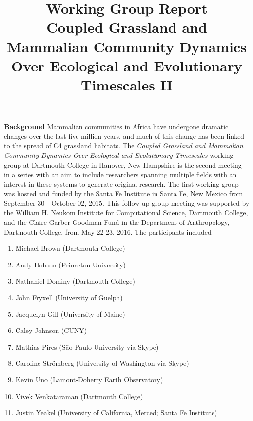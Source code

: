 \documentclass{article}[10pt]
\title{Working Group Report \\ 
Coupled Grassland and Mammalian Community Dynamics Over Ecological and Evolutionary Timescales II}
\begin{document}
\maketitle

{\bf Background} Mammalian communities in Africa have undergone dramatic changes over the last five million years, and much of this change has been linked to the spread of C4 grassland habitats.
The \emph{Coupled Grassland and Mammalian Community Dynamics Over Ecological and Evolutionary Timescales} working group at Dartmouth College in Hanover, New Hampshire is the second meeting in a series with an aim to include researchers spanning multiple fields with an interest in these systems to generate original research.
The first working group was hosted and funded by the Santa Fe Institute in Santa Fe, New Mexico from September 30 - October 02, 2015.
This follow-up group meeting was supported by the William H. Neukom Institute for Computational Science, Dartmouth College, and the Claire Garber Goodman Fund in the Department of Anthropology, Dartmouth College, from May 22-23, 2016.
The participants included

\begin{enumerate}
\item Michael Brown (Dartmouth College)
\item Andy Dobson (Princeton University)
\item Nathaniel Dominy (Dartmouth College)
\item John Fryxell (University of Guelph)
\item Jacquelyn Gill (University of Maine)
\item Caley Johnson (CUNY)
\item Mathias Pires (S\~ao Paulo University via Skype)
\item Caroline Str\"omberg (University of Washington via Skype)
\item Kevin Uno (Lamont-Doherty Earth Observatory)
\item Vivek Venkataraman (Dartmouth College)
\item Justin Yeakel (University of California, Merced; Santa Fe Institute)
\end{enumerate}

\vspace{5 mm}
\end{document}
